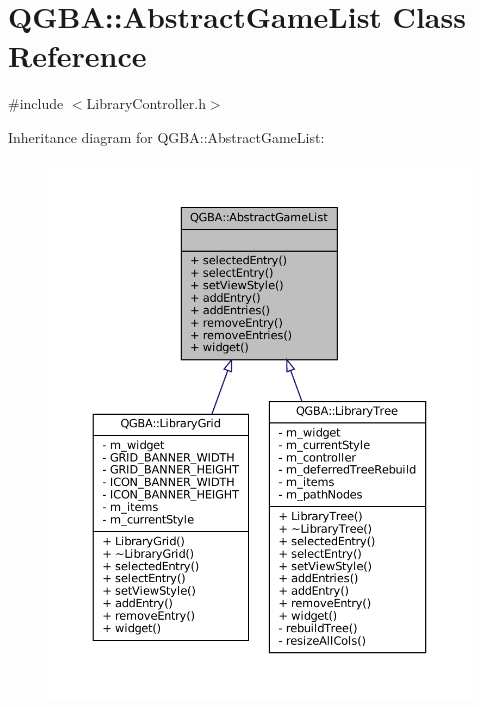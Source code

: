 \hypertarget{class_q_g_b_a_1_1_abstract_game_list}{}\section{Q\+G\+BA\+:\+:Abstract\+Game\+List Class Reference}
\label{class_q_g_b_a_1_1_abstract_game_list}


{\ttfamily \#include $<$Library\+Controller.\+h$>$}



Inheritance diagram for Q\+G\+BA\+:\+:Abstract\+Game\+List\+:
\nopagebreak
\begin{figure}[H]
\begin{center}
\leavevmode
\includegraphics[width=350pt]{class_q_g_b_a_1_1_abstract_game_list__inherit__graph}
\end{center}
\end{figure}


